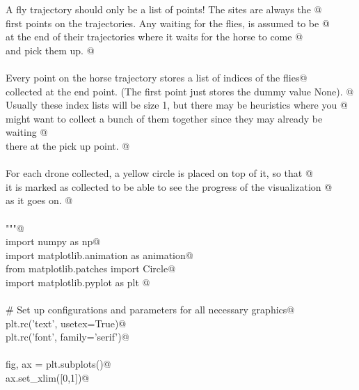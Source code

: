 \documentclass[12.0pt]{report}
\begin{document}
\begin{appendices}
\begin{flushleft}
\begin{list}{}{}
\mbox{}\verb@    A fly trajectory should only be a list of points! The sites are always the @\\
\mbox{}\verb@    first points on the trajectories. Any waiting for the flies, is assumed to be @\\
\mbox{}\verb@    at the end of their trajectories where it waits for the horse to come @\\
\mbox{}\verb@    and pick them up. @\\
\mbox{}\verb@@\\
\mbox{}\verb@    Every point on the horse trajectory stores a list of indices of the flies@\\
\mbox{}\verb@    collected at the end point. (The first point just stores the dummy value None). @\\
\mbox{}\verb@    Usually these index lists will be size 1, but there may be heuristics where you @\\
\mbox{}\verb@    might want to collect a bunch of them together since they may already be waiting @\\
\mbox{}\verb@    there at the pick up point. @\\
\mbox{}\verb@@\\
\mbox{}\verb@    For each drone collected, a yellow circle is placed on top of it, so that @\\
\mbox{}\verb@    it is marked as collected to be able to see the progress of the visualization @\\
\mbox{}\verb@    as it goes on. @\\
\mbox{}\verb@@\\
\mbox{}\verb@    """@\\
\mbox{}\verb@    import numpy as np@\\
\mbox{}\verb@    import matplotlib.animation as animation@\\
\mbox{}\verb@    from   matplotlib.patches import Circle@\\
\mbox{}\verb@    import matplotlib.pyplot as plt @\\
\mbox{}\verb@@\\
\mbox{}\verb@    # Set up configurations and parameters for all necessary graphics@\\
\mbox{}\verb@    plt.rc('text', usetex=True)@\\
\mbox{}\verb@    plt.rc('font', family='serif')@\\
\mbox{}\verb@@\\
\mbox{}\verb@    fig, ax = plt.subplots()@\\
\mbox{}\verb@    ax.set_xlim([0,1])@\\

\end{list}
\end{flushleft}
\end{appendices}
\end{document}
